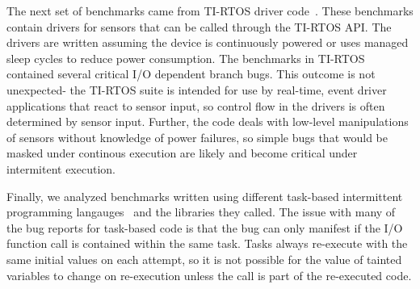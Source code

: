 The next set of benchmarks came from TI-RTOS driver code~\cite{tirtos}. These
benchmarks contain drivers for sensors that can be called through the TI-RTOS
API. The drivers are written assuming the device is continuously powered or uses
managed sleep cycles to reduce power consumption.
The benchmarks in TI-RTOS contained several critical I/O dependent branch bugs.
This outcome is not unexpected- the TI-RTOS suite is intended for use by
real-time, event driver applications that react to sensor input, so control flow
in the drivers is often determined by sensor input. Further, the code deals with
low-level manipulations of sensors without knowledge of power failures, so
simple bugs that would be masked under continous execution are likely and become
critical under intermitent execution.

Finally, we analyzed benchmarks written using different task-based intermittent
programming langauges~\cite{alpaca, chain} and the libraries they called. The
issue with many of the bug reports for task-based code is that the bug can only
manifest if the I/O function call is contained within the same task. Tasks
always re-execute with the same initial values on each attempt, so it is not
possible for the value of tainted variables to change on re-execution unless the
call is part of the re-executed code.
